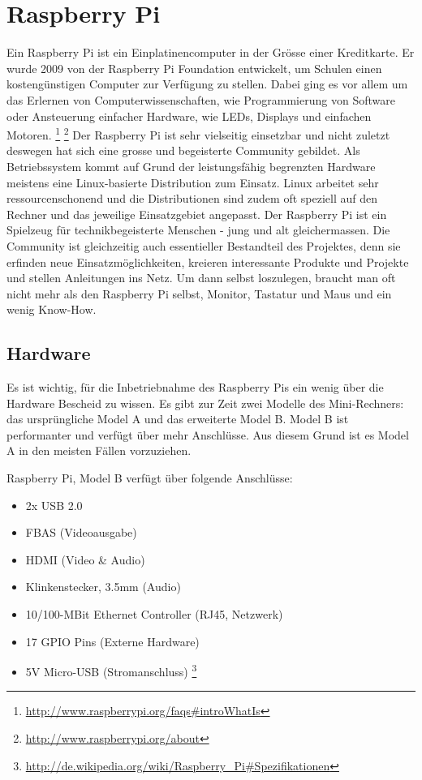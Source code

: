\section{Raspberry Pi}
Ein Raspberry Pi ist ein Einplatinencomputer in der Grösse einer Kreditkarte.
Er wurde 2009 von der Raspberry Pi Foundation entwickelt, um Schulen einen kostengünstigen Computer zur Verfügung zu stellen.
Dabei ging es vor allem um das Erlernen von Computerwissenschaften, wie Programmierung von Software oder Ansteuerung einfacher Hardware, wie LEDs, Displays und einfachen Motoren.
\footnote{\url{http://www.raspberrypi.org/faqs\#introWhatIs}}
\footnote{\url{http://www.raspberrypi.org/about}}
Der Raspberry Pi ist sehr vielseitig einsetzbar und nicht zuletzt deswegen hat sich eine grosse und begeisterte Community gebildet. Als Betriebssystem kommt auf Grund der leistungsfähig begrenzten Hardware meistens eine Linux-basierte Distribution zum Einsatz. Linux arbeitet sehr ressourcenschonend und die Distributionen sind zudem oft speziell auf den Rechner und das jeweilige Einsatzgebiet angepasst.
Der Raspberry Pi ist ein Spielzeug für technikbegeisterte Menschen - jung und alt gleichermassen. Die Community ist gleichzeitig auch essentieller Bestandteil des Projektes, denn sie erfinden neue Einsatzmöglichkeiten, kreieren interessante Produkte und Projekte und stellen Anleitungen ins Netz. Um dann selbst loszulegen, braucht man oft nicht mehr als den Raspberry Pi selbst, Monitor, Tastatur und Maus und ein wenig Know-How.

\subsection{Hardware}
Es ist wichtig, für die Inbetriebnahme des Raspberry Pis ein wenig über die Hardware Bescheid zu wissen.
Es gibt zur Zeit zwei Modelle des Mini-Rechners: das ursprüngliche Model A und das erweiterte Model B. Model B ist performanter und verfügt über mehr Anschlüsse. Aus diesem Grund ist es Model A in den meisten Fällen vorzuziehen.

Raspberry Pi, Model B verfügt über folgende Anschlüsse:

\begin{itemize}
  \item 2x USB 2.0
  \item FBAS (Videoausgabe)
  \item HDMI (Video \& Audio)
  \item Klinkenstecker, 3.5mm (Audio)
  \item 10/100-MBit Ethernet Controller (RJ45, Netzwerk)
  \item 17 GPIO Pins (Externe Hardware)
  \item 5V Micro-USB (Stromanschluss) 
\footnote{\url{http://de.wikipedia.org/wiki/Raspberry_Pi\#Spezifikationen}}
\end{itemize}


